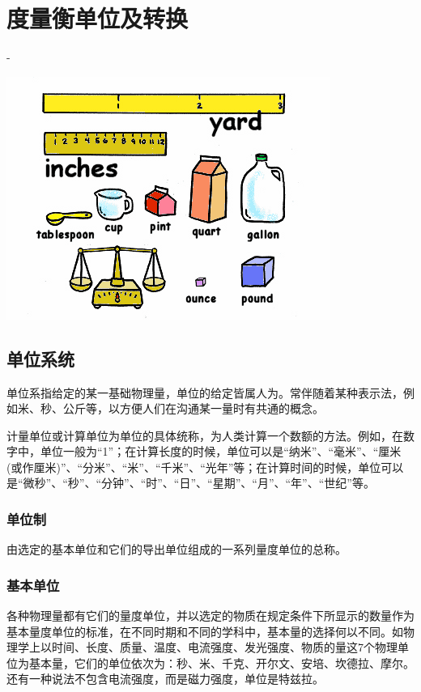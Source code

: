 \section {度量衡单位及转换}

-
    \begin{center}
        \includegraphics[scale=0.7] {units.png}
    \end{center}

\subsection {单位系统}

        单位系指给定的某一基础物理量，单位的给定皆属人为。常伴随着某种表示法，例如米、秒、公斤等，以方便人们在沟通某一量时有共通的概念。

        计量单位或计算单位为单位的具体统称，为人类计算一个数额的方法。例如，在数字中，单位一般为“1”；在计算长度的时候，单位可以是“纳米”、“毫米”、“厘米(或作厘米)”、“分米”、“米”、“千米”、“光年”等；在计算时间的时候，单位可以是“微秒”、“秒”、“分钟”、“时”、“日”、“星期”、“月”、“年”、“世纪”等。

    \subsubsection {单位制}

        由选定的基本单位和它们的导出单位组成的一系列量度单位的总称。

    \subsubsection {基本单位}

        各种物理量都有它们的量度单位，并以选定的物质在规定条件下所显示的数量作为基本量度单位的标准，在不同时期和不同的学科中，基本量的选择何以不同。如物理学上以时间、长度、质量、温度、电流强度、发光强度、物质的量这7个物理单位为基本量，它们的单位依次为：秒、米、千克、开尔文、安培、坎德拉、摩尔。 还有一种说法不包含电流强度，而是磁力强度，单位是特兹拉。

